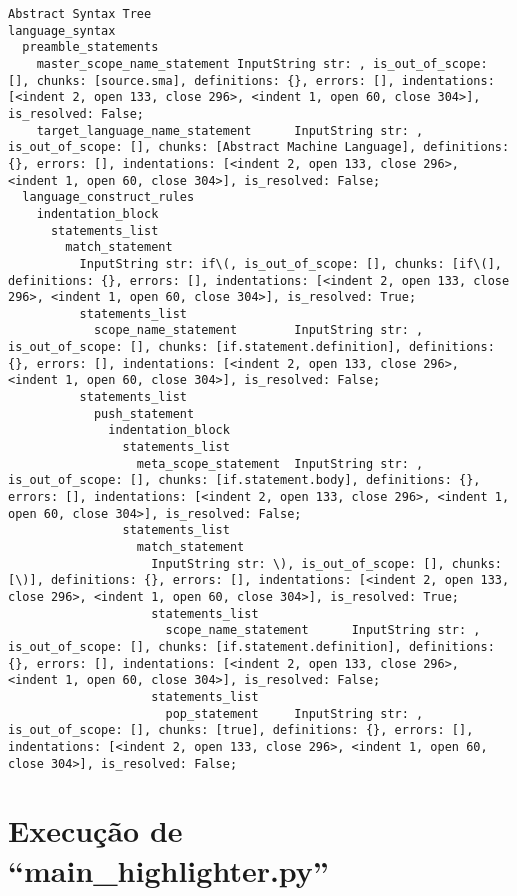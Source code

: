 \begin{code}
\begin{verbatim}
Abstract Syntax Tree
language_syntax
  preamble_statements
    master_scope_name_statement InputString str: , is_out_of_scope: [], chunks: [source.sma], definitions: {}, errors: [], indentations: [<indent 2, open 133, close 296>, <indent 1, open 60, close 304>], is_resolved: False;
    target_language_name_statement      InputString str: , is_out_of_scope: [], chunks: [Abstract Machine Language], definitions: {}, errors: [], indentations: [<indent 2, open 133, close 296>, <indent 1, open 60, close 304>], is_resolved: False;
  language_construct_rules
    indentation_block
      statements_list
        match_statement
          InputString str: if\(, is_out_of_scope: [], chunks: [if\(], definitions: {}, errors: [], indentations: [<indent 2, open 133, close 296>, <indent 1, open 60, close 304>], is_resolved: True;
          statements_list
            scope_name_statement        InputString str: , is_out_of_scope: [], chunks: [if.statement.definition], definitions: {}, errors: [], indentations: [<indent 2, open 133, close 296>, <indent 1, open 60, close 304>], is_resolved: False;
          statements_list
            push_statement
              indentation_block
                statements_list
                  meta_scope_statement  InputString str: , is_out_of_scope: [], chunks: [if.statement.body], definitions: {}, errors: [], indentations: [<indent 2, open 133, close 296>, <indent 1, open 60, close 304>], is_resolved: False;
                statements_list
                  match_statement
                    InputString str: \), is_out_of_scope: [], chunks: [\)], definitions: {}, errors: [], indentations: [<indent 2, open 133, close 296>, <indent 1, open 60, close 304>], is_resolved: True;
                    statements_list
                      scope_name_statement      InputString str: , is_out_of_scope: [], chunks: [if.statement.definition], definitions: {}, errors: [], indentations: [<indent 2, open 133, close 296>, <indent 1, open 60, close 304>], is_resolved: False;
                    statements_list
                      pop_statement     InputString str: , is_out_of_scope: [], chunks: [true], definitions: {}, errors: [], indentations: [<indent 2, open 133, close 296>, <indent 1, open 60, close 304>], is_resolved: False;
\end{verbatim}
\end{code}


\chapter{Execução de ``main\_highlighter.py''}

